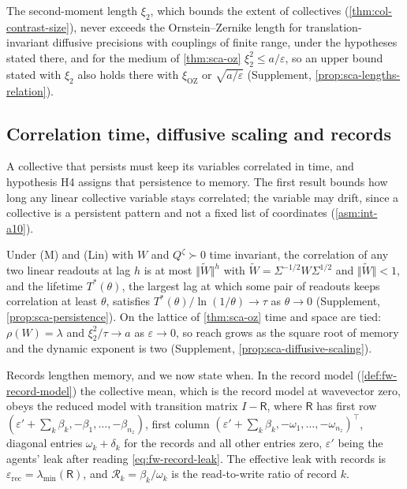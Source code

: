 The second-moment length $\xi_2$, which bounds the extent of collectives (\cref{thm:col-contrast-size}), never exceeds the Ornstein--Zernike length for translation-invariant diffusive precisions with couplings of finite range, under the hypotheses stated there, and for the medium of \cref{thm:sca-oz} $\xi_2^2\le a/\varepsilon$, so an upper bound stated with $\xi_2$ also holds there with $\xi_{\mathrm{OZ}}$ or $\sqrt{a/\varepsilon}$ (Supplement, \cref{prop:sca-lengths-relation}).

\subsection{Correlation time, diffusive scaling and records}\label{sec:sca-time}

A collective that persists must keep its variables correlated in time, and hypothesis H4 assigns that persistence to memory. The first result bounds how long any linear collective variable stays correlated; the variable may drift, since a collective is a persistent pattern and not a fixed list of coordinates (\cref{asm:int-a10}).

Under \textup{(M)} and \textup{(Lin)} with $W$ and $Q^\zeta\succ0$ time invariant, the correlation of any two linear readouts at lag $h$ is at most $\Vert\tilde W\Vert^h$ with $\tilde W=\Sigma^{-1/2}W\Sigma^{1/2}$ and $\Vert\tilde W\Vert<1$, and the lifetime $T^\ast(\theta)$, the largest lag at which some pair of readouts keeps correlation at least $\theta$, satisfies $T^\ast(\theta)/\ln(1/\theta)\to\tau$ as $\theta\to0$ (Supplement, \cref{prop:sca-persistence}). On the lattice of \cref{thm:sca-oz} time and space are tied: $\rho(W)=\lambda$ and $\xi_2^2/\tau\to a$ as $\varepsilon\to0$, so reach grows as the square root of memory and the dynamic exponent is two (Supplement, \cref{prop:sca-diffusive-scaling}).

Records lengthen memory, and we now state when. In the record model (\cref{def:fw-record-model}) the collective mean, which is the record model at wavevector zero, obeys the reduced model with transition matrix $I-\mathsf R$, where $\mathsf R$ has first row $(\varepsilon'+\sum_k\beta_k,-\beta_1,\dots,-\beta_{n_z})$, first column $(\varepsilon'+\sum_k\beta_k,-\omega_1,\dots,-\omega_{n_z})^\top$, diagonal entries $\omega_k+\delta_k$ for the records and all other entries zero, $\varepsilon'$ being the agents' leak after reading \eqref{eq:fw-record-leak}. The effective leak with records is $\varepsilon_{\mathrm{rec}}=\lambda_{\min}(\mathsf R)$, and $\mathcal R_k=\beta_k/\omega_k$ is the read-to-write ratio of record $k$.

